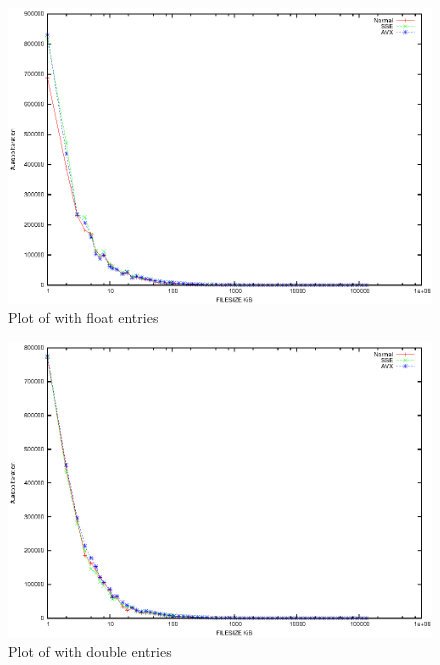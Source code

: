 \documentclass{article}
\begin{document}
\begin{center}
	\begin{figure}[h]
	\includegraphics[scale=0.75]{images/float.eps}
		\caption{Plot of with float entries}
	\end{figure}
\end{center}

\begin{center}
	\begin{figure}[h]
	\includegraphics[scale=0.75]{images/double.eps}
		\caption{Plot of with double entries}
	\end{figure}
\end{center}
\end{document}
